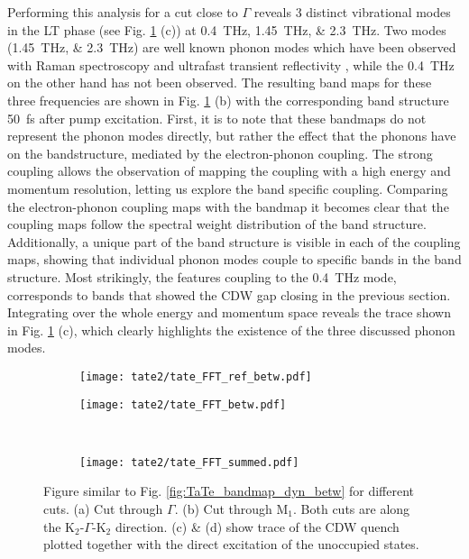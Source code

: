 Performing this analysis for a cut close to $\Gamma$ reveals 3 distinct vibrational modes in the LT phase (see Fig. \ref{fig:TaTe_FFT_betw} (c)) at \qtylist{0.4; 1.45; 2.3}{\tera\hertz}.
Two modes (\qtylist{1.45; 2.3}{\tera\hertz}) are well known phonon modes which have been observed with Raman spectroscopy and ultrafast transient reflectivity \cite{luo_subtle_2021, hu_optical_2022}, while the \qty{0.4}{\tera\hertz} on the other hand has not been observed.
The resulting band maps for these three frequencies are shown in Fig. \ref{fig:TaTe_FFT_betw} (b) with the corresponding band structure \qty{50}{\femto\second} after pump excitation.
First, it is to note that these bandmaps do not represent the phonon modes directly, but rather the effect that the phonons have on the bandstructure, mediated by the electron-phonon coupling.
The strong coupling allows the observation of mapping the coupling with a high energy and momentum resolution, letting us explore the band specific coupling.
Comparing the electron-phonon coupling maps with the bandmap it becomes clear that the coupling maps follow the spectral weight distribution of the band structure.
Additionally, a unique part of the band structure is visible in each of the coupling maps, showing that individual phonon modes couple to specific bands in the band structure.
Most strikingly, the features coupling to the \qty{0.4}{\tera\hertz} mode, corresponds to bands that showed the CDW gap closing in the previous section.
Integrating over the whole energy and momentum space reveals the trace shown in Fig. \ref{fig:TaTe_FFT_betw} (c), which clearly highlights the existence of the three discussed phonon modes.

\begin{figure}[b!]
	\centering
	\begin{subfigure}[b]{0.24\textwidth}
		\texttt{[image: tate2/tate\_FFT\_ref\_betw.pdf]}
		\caption{}
	\end{subfigure}
	\begin{subfigure}[b]{0.72\textwidth}
		\texttt{[image: tate2/tate\_FFT\_betw.pdf]}
		\caption{}
	\end{subfigure}
	\\
	\begin{subfigure}[b]{0.33\textwidth}
		\texttt{[image: tate2/tate\_FFT\_summed.pdf]}
		\caption{}
	\end{subfigure}
	\caption{Figure similar to Fig. \ref{fig:TaTe_bandmap_dyn_betw} for different cuts. (a) Cut through $\Gamma$. (b) Cut through M$_1$. Both cuts are along the K$_2$-$\Gamma$-K$_2$ direction. (c) \& (d) show trace of the CDW quench plotted together with the direct excitation of the unoccupied states.}
	\label{fig:TaTe_FFT_betw}
\end{figure}

